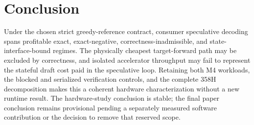 \section{Conclusion}
\label{sec:conclusion}
Under the chosen strict greedy-reference contract, consumer speculative decoding spans profitable exact, exact-negative, correctness-inadmissible, and state-interface-bound regimes. The physically cheapest target-forward path may be excluded by correctness, and isolated accelerator throughput may fail to represent the stateful draft cost paid in the speculative loop. Retaining both M4 workloads, the blocked and serialized verification controls, and the complete 358H decomposition makes this a coherent hardware characterization without a new runtime result. The hardware-study conclusion is stable; the final paper conclusion remains provisional pending a separately measured software contribution or the decision to remove that reserved scope.
